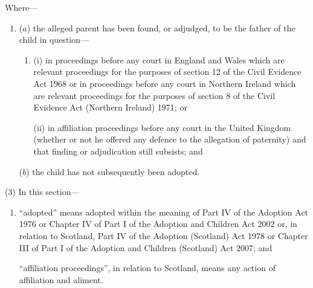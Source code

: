 \documentclass[12pt,a4paper]{article}
\begin{document}
Where---
\begin{enumerate}\item[]
($a$) the alleged parent has been found, or adjudged, to be the father of the child in question---
\begin{enumerate}\item[]
(i)
in proceedings before any court in England and Wales which are relevant proceedings for the purposes of section 12 of the Civil Evidence Act 1968 or in proceedings before any court in Northern Ireland which are relevant proceedings for the purposes of section 8 of the Civil Evidence Act (Northern Ireland) 1971; or

(ii)
in affiliation proceedings before any court in the United Kingdom (whether or not he offered any defence to the allegation of paternity) and that finding or adjudication still subsists; and
\end{enumerate}

($b$) the child has not subsequently been adopted.
\end{enumerate}

(3) In this section---
\begin{enumerate}\item[]
 “adopted” means adopted within the meaning of Part IV of the Adoption Act 1976 or Chapter IV of Part I of the Adoption and Children Act 2002 or, in relation to Scotland, Part IV of the Adoption (Scotland) Act 1978 or Chapter III of Part I of the Adoption and Children (Scotland) Act 2007; and 

“affiliation proceedings”, in relation to Scotland, means any action of affiliation and aliment.
\end{enumerate}
\end{document}
